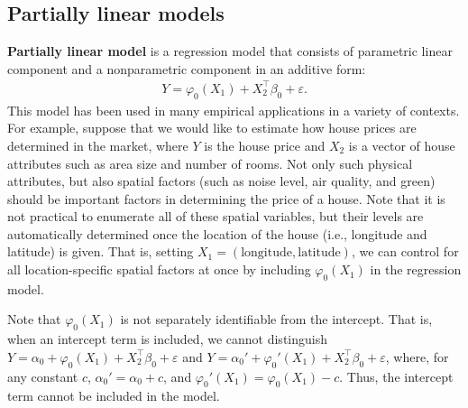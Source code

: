 \documentclass[10.5pt, A4paper, openany, uplatex]{book}
\newcommand{\eps}{\varepsilon}
\numberwithin{equation}{section}
\begin{document}
\subsection{Partially linear models}

\textbf{Partially linear model} is a regression model that consists of parametric linear component and a nonparametric component in an additive form:
\begin{align}\label{eq:plm}
	Y = \varphi_0(X_1) + X_2^\top\beta_0 + \eps.
\end{align}
This model has been used in many empirical applications in a variety of contexts.
For example, suppose that we would like to estimate how house prices are determined in the market, where $Y$ is the house price and $X_2$ is a vector of house attributes such as area size and number of rooms.
Not only such physical attributes, but also spatial factors (such as noise level, air quality, and green) should be important factors in determining the price of a house.
Note that it is not practical to enumerate all of these spatial variables, but their levels are automatically determined once the location of the house (i.e., longitude and latitude) is given.
That is, setting $X_1 = (\text{longitude}, \text{latitude})$, we can control for all location-specific spatial factors at once by including $\varphi_0(X_1)$ in the regression model.

Note that $\varphi_0(X_1)$ is not separately identifiable from the intercept.
That is, when an intercept term is included, we cannot distinguish $Y = \alpha_0 + \varphi_0(X_1) + X_2^\top \beta_0 + \eps$ and $Y = \alpha_0' + \varphi_0'(X_1) + X_2^\top \beta_0 + \eps$, where, for any constant $c$, $\alpha_0' = \alpha_0 + c$, and $\varphi_0'(X_1) = \varphi_0(X_1) - c$.
Thus, the intercept term cannot be included in the model.
\end{document}
